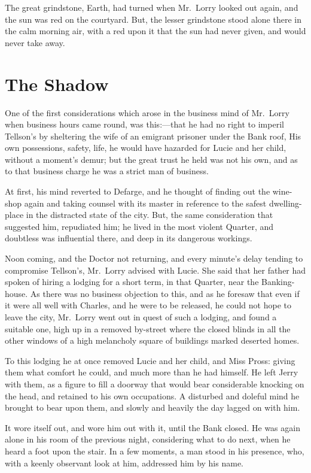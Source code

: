 The great grindstone, Earth, had turned when Mr.\ Lorry looked out again,
and the sun was red on the courtyard.  But, the lesser grindstone
stood alone there in the calm morning air, with a red upon it that
the sun had never given, and would never take away.



\chapter{The Shadow}


One of the first considerations which arose in the business mind of
Mr.\ Lorry when business hours came round, was this:---that he had no
right to imperil Tellson's by sheltering the wife of an emigrant
prisoner under the Bank roof, His own possessions, safety, life,
he would have hazarded for Lucie and her child, without a moment's
demur; but the great trust he held was not his own, and as to that
business charge he was a strict man of business.

At first, his mind reverted to Defarge, and he thought of finding out
the wine-shop again and taking counsel with its master in reference
to the safest dwelling-place in the distracted state of the city.
But, the same consideration that suggested him, repudiated him; he
lived in the most violent Quarter, and doubtless was influential
there, and deep in its dangerous workings.

Noon coming, and the Doctor not returning, and every minute's delay
tending to compromise Tellson's, Mr.\ Lorry advised with Lucie.
She said that her father had spoken of hiring a lodging for a short
term, in that Quarter, near the Banking-house.  As there was no
business objection to this, and as he foresaw that even if it were
all well with Charles, and he were to be released, he could not hope
to leave the city, Mr.\ Lorry went out in quest of such a lodging, and
found a suitable one, high up in a removed by-street where the closed
blinds in all the other windows of a high melancholy square of buildings
marked deserted homes.

To this lodging he at once removed Lucie and her child, and Miss
Pross:  giving them what comfort he could, and much more than he had
himself.  He left Jerry with them, as a figure to fill a doorway that
would bear considerable knocking on the head, and retained to his own
occupations.  A disturbed and doleful mind he brought to bear upon them,
and slowly and heavily the day lagged on with him.

It wore itself out, and wore him out with it, until the Bank closed.
He was again alone in his room of the previous night, considering
what to do next, when he heard a foot upon the stair.  In a few
moments, a man stood in his presence, who, with a keenly observant
look at him, addressed him by his name.

